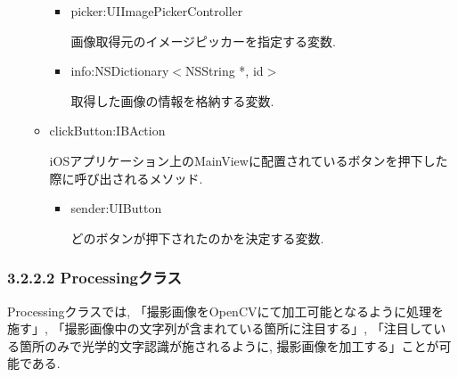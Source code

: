 \begin{itemize}
\begin{itemize}
\begin{itemize}
\item picker:UIImagePickerController

画像取得元のイメージピッカーを指定する変数.

\item info:NSDictionary$<$NSString *, id$>$

取得した画像の情報を格納する変数.
\end{itemize}

\item clickButton:IBAction

iOSアプリケーション上のMainViewに配置されているボタンを押下した際に呼び出されるメソッド.

\begin{itemize}
\item sender:UIButton

どのボタンが押下されたのかを決定する変数.
\end{itemize}

\end{itemize}

\end{itemize}

\subsubsection{3.2.2.2 Processingクラス}
Processingクラスでは, 「撮影画像をOpenCVにて加工可能となるように処理を施す」, 「撮影画像中の文字列が含まれている箇所に注目する」, 「注目している箇所のみで光学的文字認識が施されるように, 撮影画像を加工する」ことが可能である.

